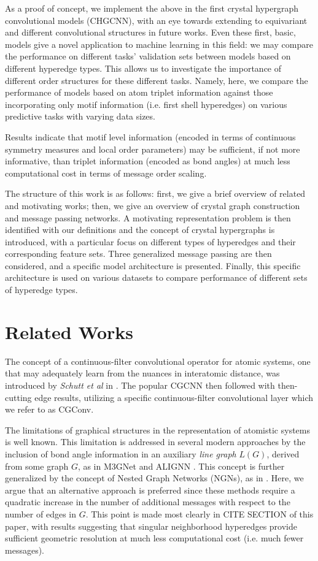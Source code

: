 \documentclass[10pt,a4paper]{article}
\begin{document}
As a proof of concept, we implement the above in the first crystal hypergraph convolutional models (CHGCNN), with an eye towards extending to equivariant and different convolutional structures in future works. Even these first, basic, models give a novel application to machine learning in this field: we may compare the performance on different tasks' validation sets between models based on different hyperedge types. This allows us to investigate the importance of different order structures for these different tasks. Namely, here, we compare the performance of models based on atom triplet information against those incorporating only motif information (i.e. first shell hyperedges) on various predictive tasks with varying data sizes. 

Results indicate that motif level information (encoded in terms of continuous symmetry measures and local order parameters) may be sufficient, if not more informative, than triplet information (encoded as bond angles) at much less computational cost in terms of message order scaling.

The structure of this work is as follows: first, we give a brief overview of related and motivating works; then, we give an overview of crystal graph construction and message passing networks. A motivating representation problem is then identified with our definitions and the concept of crystal hypergraphs is introduced, with a particular focus on different types of hyperedges and their corresponding feature sets. Three generalized message passing are then considered, and a specific model architecture is presented. Finally, this specific architecture is used on various datasets to compare performance of different sets of hyperedge types.

\section{Related Works}
The concept of a continuous-filter convolutional operator for atomic systems, one that may adequately learn from the nuances in interatomic distance, was introduced by \textit{Schutt et al} in \cite{schnet}. The popular CGCNN then followed with then-cutting edge results, utilizing a specific continuous-filter convolutional layer which we refer to as CGConv. 

The limitations of graphical structures in the representation of atomistic systems is well known. This limitation is addressed in several modern approaches by the inclusion of bond angle information in an auxiliary \textit{line graph} $L(G)$, derived from some graph $G$, as in M3GNet \cite{m3gnet} and ALIGNN \cite{alignn}. This concept is further generalized by the concept of Nested Graph Networks (NGNs), as in \cite{congn}. Here, we argue that an alternative approach is preferred since these methods require a quadratic increase in the number of additional messages with respect to the number of edges in $G$. This point is made most clearly in CITE SECTION of this paper, with results suggesting that singular neighborhood hyperedges provide sufficient geometric resolution at much less computational cost (i.e. much fewer messages).
\end{document}
